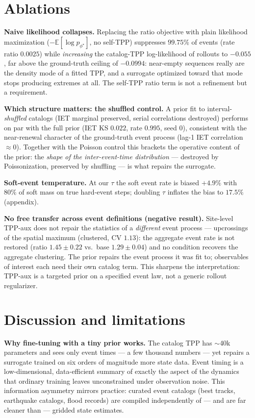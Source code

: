 \documentclass[11pt]{article}
\newcommand{\E}{\mathbb{E}}
\newcommand{\gttpp}{p_{\phi^\star}}
\begin{document}
\section{Ablations}
\label{sec:ablations}

\textbf{Naive likelihood collapses.} Replacing the ratio objective with
plain likelihood maximization ($-\E[\log \gttpp]$, no self-TPP) suppresses
$99.75\%$ of events (rate ratio $0.0025$) while \emph{increasing} the
catalog-TPP log-likelihood of rollouts to $-0.055$, far above the
ground-truth ceiling of $-0.0994$: near-empty sequences really are the
density mode of a fitted TPP, and a surrogate optimized toward that mode
stops producing extremes at all. The self-TPP ratio term is not a
refinement but a requirement.

\textbf{Which structure matters: the shuffled control.} A prior fit to
interval-\emph{shuffled} catalogs (IET marginal preserved, serial
correlations destroyed) performs on par with the full prior (IET KS
$0.022$, rate $0.995$, seed 0), consistent with the near-renewal character
of the ground-truth event process (lag-1 IET correlation $\approx 0$).
Together with the Poisson control this brackets the operative content of
the prior: the \emph{shape of the inter-event-time distribution} ---
destroyed by Poissonization, preserved by shuffling --- is what repairs
the surrogate.

\textbf{Soft-event temperature.} At our $\tau$ the soft event rate is
biased $+4.9\%$ with $80\%$ of soft mass on true hard-event steps;
doubling $\tau$ inflates the bias to $17.5\%$ (appendix).

\textbf{No free transfer across event definitions (negative result).}
Site-level TPP-aux does not repair the statistics of a \emph{different}
event process --- upcrossings of the spatial maximum (clustered, CV
$1.13$): the aggregate event rate is not restored (ratio $1.45 \pm 0.22$
vs.\ base $1.29 \pm 0.04$) and no condition recovers the aggregate
clustering. The prior repairs the event process it was fit to; observables
of interest each need their own catalog term. This sharpens the
interpretation: TPP-aux is a targeted prior on a specified event law, not
a generic rollout regularizer.

\section{Discussion and limitations}
\label{sec:discussion}

\textbf{Why fine-tuning with a tiny prior works.} The catalog TPP has
$\sim$40k parameters and sees only event times --- a few thousand numbers
--- yet repairs a surrogate trained on six orders of magnitude more state
data. Event timing is a low-dimensional, data-efficient summary of exactly
the aspect of the dynamics that ordinary training leaves unconstrained
under observation noise. This information asymmetry mirrors practice:
curated event catalogs (best tracks, earthquake catalogs, flood records)
are compiled independently of --- and are far cleaner than --- gridded
state estimates.
\end{document}
